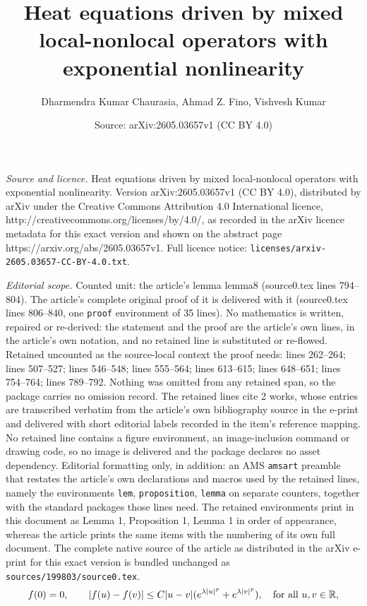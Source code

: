 \documentclass[10pt,a4paper]{amsart}
\title{Heat equations driven by mixed local-nonlocal operators with exponential nonlinearity}
\author{Dharmendra Kumar Chaurasia, Ahmad Z. Fino, Vishvesh Kumar}
\date{Source: arXiv:2605.03657v1 (CC BY 4.0)}
\begin{document}
\maketitle

\noindent\emph{Source and licence.} Heat equations driven by mixed local-nonlocal operators with exponential nonlinearity. Version arXiv:2605.03657v1 (CC BY 4.0), distributed by arXiv under the Creative Commons Attribution 4.0 International licence, http://creativecommons.org/licenses/by/4.0/, as recorded in the arXiv licence metadata for this exact version and shown on the abstract page https://arxiv.org/abs/2605.03657v1. Full licence notice: \texttt{licenses/arxiv-2605.03657-CC-BY-4.0.txt}.\par\smallskip

\noindent\textit{Editorial scope.} Counted unit: the article's lemma lemma8 (source0.tex lines 794--804). The article's complete original proof of it is delivered with it (source0.tex lines 806--840, one \texttt{proof} environment of 35 lines). No mathematics is written, repaired or re-derived: the statement and the proof are the article's own lines, in the article's own notation, and no retained line is substituted or re-flowed.  Retained uncounted as the source-local context the proof needs: lines 262--264; lines 507--527; lines 546--548; lines 555--564; lines 613--615; lines 648--651; lines 754--764; lines 789--792.  Nothing was omitted from any retained span, so the package carries no omission record.  The retained lines cite 2 works, whose entries are transcribed verbatim from the article's own bibliography source in the e-print and delivered with short editorial labels recorded in the item's reference mapping.  No retained line contains a figure environment, an image-inclusion command or drawing code, so no image is delivered and the package declares no asset dependency.  Editorial formatting only, in addition: an AMS \texttt{amsart} preamble that restates the article's own declarations and macros used by the retained lines, namely the environments \texttt{lem}, \texttt{proposition}, \texttt{lemma} on separate counters, together with the standard packages those lines need.  The retained environments print in this document as Lemma 1, Proposition 1, Lemma 1 in order of appearance, whereas the article prints the same items with the numbering of its own full document.  The complete native source of the article as distributed in the arXiv e-print for this exact version is bundled unchanged as \texttt{sources/199803/source0.tex}.
 \begin{equation}\label{eq3}
  f(0)=0,\qquad |f(u)-f(v)|\leq C|u-v|(e^{\lambda |u|^p}+e^{\lambda |v|^p}),\quad \hbox{for all}\,\, u,v\in\mathbb{R}, 
  \end{equation} 
\end{document}
